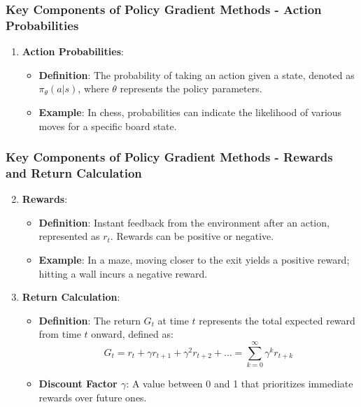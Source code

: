 \documentclass[aspectratio=169]{beamer}
\begin{document}
\begin{frame}[fragile]
    \frametitle{Key Components of Policy Gradient Methods - Action Probabilities}
    \begin{enumerate}
        \item \textbf{Action Probabilities}:
            \begin{itemize}
                \item \textbf{Definition}: The probability of taking an action given a state, denoted as \( \pi_\theta(a|s) \), where \( \theta \) represents the policy parameters.
                \item \textbf{Example}: In chess, probabilities can indicate the likelihood of various moves for a specific board state.
            \end{itemize}
    \end{enumerate}
\end{frame}

\begin{frame}[fragile]
    \frametitle{Key Components of Policy Gradient Methods - Rewards and Return Calculation}
    \begin{enumerate}
        \setcounter{enumi}{1}
        \item \textbf{Rewards}:
            \begin{itemize}
                \item \textbf{Definition}: Instant feedback from the environment after an action, represented as \( r_t \). Rewards can be positive or negative.
                \item \textbf{Example}: In a maze, moving closer to the exit yields a positive reward; hitting a wall incurs a negative reward.
            \end{itemize}
        
        \item \textbf{Return Calculation}:
            \begin{itemize}
                \item \textbf{Definition}: The return \( G_t \) at time \( t \) represents the total expected reward from time \( t \) onward, defined as:
                \begin{equation}
                    G_t = r_t + \gamma r_{t+1} + \gamma^2 r_{t+2} + \ldots = \sum_{k=0}^{\infty} \gamma^k r_{t+k}
                \end{equation}
                \item \textbf{Discount Factor \( \gamma \)}: A value between 0 and 1 that prioritizes immediate rewards over future ones.
            \end{itemize}
    \end{enumerate}
\end{frame}
\end{document}
